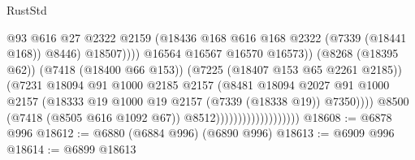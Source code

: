\begin{lexlean}{RustStd}
\begin{coremodule}
                                                        @93
                                                        @616
                                                        @27
                                                        @2322
                                                        @2159
                                                        (@18436
                                                          @168
                                                          @616
                                                          @168
                                                          @2322
                                                          (@7339 (@18441 @168))
                                                          @8446)
                                                        @18507))))
                                                @16564
                                                @16567
                                                @16570
                                                @16573))
                                            (@8268 (@18395 @62))
                                            (@7418 (@18400 @66 @153))
                                            (@7225 (@18407 @153 @65 @2261 @2185))
                                            (@7231
                                              @18094
                                              @91
                                              @1000
                                              @2185
                                              @2157
                                              (@8481
                                                @18094
                                                @2027
                                                @91
                                                @1000
                                                @2157
                                                (@18333
                                                  @19
                                                  @1000
                                                  @19
                                                  @2157
                                                  (@7339 (@18338 @19))
                                                  @7350))))
                                          @8500
                                          (@7418 (@8505 @616 @1092 @67))
                                          @8512)))))))))))))))))))
@18608 := @6878 @996
@18612 := @6880 (@6884 @996) (@6890 @996)
@18613 := @6909 @996
@18614 := @6899 @18613

\end{coremodule}
\end{lexlean}
